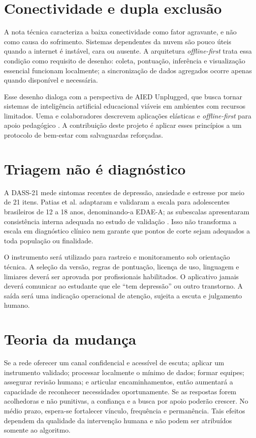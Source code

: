 \documentclass[
  12pt,
  openright,
  oneside,
  a4paper,
  english,
  brazil
]{abntex2}
\begin{document}
\section{Conectividade e dupla exclusão}

A nota técnica caracteriza a baixa conectividade como fator agravante, e não
como causa do sofrimento. Sistemas dependentes da nuvem são pouco úteis quando a
internet é instável, cara ou ausente. A arquitetura \emph{offline-first} trata
essa condição como requisito de desenho: coleta, pontuação, inferência e
visualização essencial funcionam localmente; a sincronização de dados agregados
ocorre apenas quando disponível e necessária.

Esse desenho dialoga com a perspectiva de AIED Unplugged, que busca tornar
sistemas de inteligência artificial educacional viáveis em ambientes com
recursos limitados. Uema e colaboradores descrevem aplicações elásticas e
\emph{offline-first} para apoio pedagógico \cite{uema2026}. A contribuição deste
projeto é aplicar esses princípios a um protocolo de bem-estar com salvaguardas
reforçadas.

\section{Triagem não é diagnóstico}

A DASS-21 mede sintomas recentes de depressão, ansiedade e estresse por meio de
21 itens. Patias et al. adaptaram e validaram a escala para adolescentes
brasileiros de 12 a 18 anos, denominando-a EDAE-A; as subescalas apresentaram
consistência interna adequada no estudo de validação \cite{patias2016}. Isso não
transforma a escala em diagnóstico clínico nem garante que pontos de corte sejam
adequados a toda população ou finalidade.

O instrumento será utilizado para rastreio e monitoramento sob orientação
técnica. A seleção da versão, regras de pontuação, licença de uso, linguagem e
limiares deverá ser aprovada por profissionais habilitados. O aplicativo jamais
deverá comunicar ao estudante que ele ``tem depressão'' ou outro transtorno. A
saída será uma indicação operacional de atenção, sujeita a escuta e julgamento
humano.

\clearpage
\section{Teoria da mudança}

Se a rede oferecer um canal confidencial e acessível de escuta; aplicar um
instrumento validado; processar localmente o mínimo de dados; formar equipes;
assegurar revisão humana; e articular encaminhamentos, então aumentará a
capacidade de reconhecer necessidades oportunamente. Se as respostas forem
acolhedoras e não punitivas, a confiança e a busca por apoio poderão crescer.
No médio prazo, espera-se fortalecer vínculo, frequência e permanência. Tais
efeitos dependem da qualidade da intervenção humana e não podem ser atribuídos
somente ao algoritmo.
\end{document}
